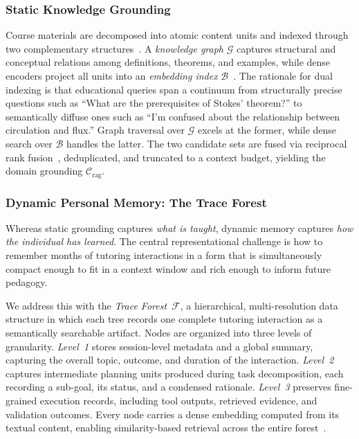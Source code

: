 \subsubsection{Static Knowledge Grounding}
\label{sec:rag}

Course materials are decomposed into atomic content units and indexed through two complementary structures~\citep{wang2024mineruopensourcesolutionprecise}.
A \emph{knowledge graph} $\mathcal{G}$ captures structural and conceptual relations among definitions, theorems, and examples, while dense encoders project all units into an \emph{embedding index} $\mathcal{B}$~\citep{guo2025raganythingallinoneragframework}.
The rationale for dual indexing is that educational queries span a continuum from structurally precise questions such as ``What are the prerequisites of Stokes' theorem?'' to semantically diffuse ones such as ``I'm confused about the relationship between circulation and flux.''
Graph traversal over $\mathcal{G}$ excels at the former, while dense search over $\mathcal{B}$ handles the latter.
The two candidate sets are fused via reciprocal rank fusion~\citep{cormack2009reciprocal}, deduplicated, and truncated to a context budget, yielding the domain grounding $\mathcal{C}_{\text{rag}}$.

\subsubsection{Dynamic Personal Memory: The Trace Forest}
\label{sec:memory}

Whereas static grounding captures \emph{what is taught}, dynamic memory captures \emph{how the individual has learned}.
The central representational challenge is how to remember months of tutoring interactions in a form that is simultaneously compact enough to fit in a context window and rich enough to inform future pedagogy.

We address this with the \emph{Trace Forest}~$\mathcal{F}$, a hierarchical, multi-resolution data structure in which each tree records one complete tutoring interaction as a semantically searchable artifact.
Nodes are organized into three levels of granularity.
\emph{Level~1} stores session-level metadata and a global summary, capturing the overall topic, outcome, and duration of the interaction.
\emph{Level~2} captures intermediate planning units produced during task decomposition, each recording a sub-goal, its status, and a condensed rationale.
\emph{Level~3} preserves fine-grained execution records, including tool outputs, retrieved evidence, and validation outcomes.
Every node carries a dense embedding computed from its textual content, enabling similarity-based retrieval across the entire forest~\citep{packer2023memgpt,qin2025himem,yang2025gmemory}.


